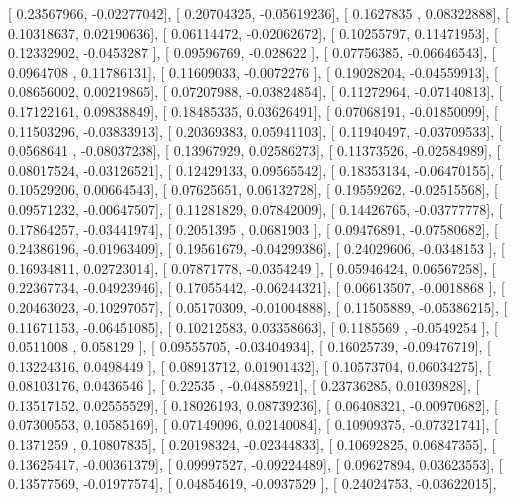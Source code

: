 \documentclass{article}
\begin{document}
       [ 0.23567966, -0.02277042],
       [ 0.20704325, -0.05619236],
       [ 0.1627835 ,  0.08322888],
       [ 0.10318637,  0.02190636],
       [ 0.06114472, -0.02062672],
       [ 0.10255797,  0.11471953],
       [ 0.12332902, -0.0453287 ],
       [ 0.09596769, -0.028622  ],
       [ 0.07756385, -0.06646543],
       [ 0.0964708 ,  0.11786131],
       [ 0.11609033, -0.0072276 ],
       [ 0.19028204, -0.04559913],
       [ 0.08656002,  0.00219865],
       [ 0.07207988, -0.03824854],
       [ 0.11272964, -0.07140813],
       [ 0.17122161,  0.09838849],
       [ 0.18485335,  0.03626491],
       [ 0.07068191, -0.01850099],
       [ 0.11503296, -0.03833913],
       [ 0.20369383,  0.05941103],
       [ 0.11940497, -0.03709533],
       [ 0.0568641 , -0.08037238],
       [ 0.13967929,  0.02586273],
       [ 0.11373526, -0.02584989],
       [ 0.08017524, -0.03126521],
       [ 0.12429133,  0.09565542],
       [ 0.18353134, -0.06470155],
       [ 0.10529206,  0.00664543],
       [ 0.07625651,  0.06132728],
       [ 0.19559262, -0.02515568],
       [ 0.09571232, -0.00647507],
       [ 0.11281829,  0.07842009],
       [ 0.14426765, -0.03777778],
       [ 0.17864257, -0.03441974],
       [ 0.2051395 ,  0.0681903 ],
       [ 0.09476891, -0.07580682],
       [ 0.24386196, -0.01963409],
       [ 0.19561679, -0.04299386],
       [ 0.24029606, -0.0348153 ],
       [ 0.16934811,  0.02723014],
       [ 0.07871778, -0.0354249 ],
       [ 0.05946424,  0.06567258],
       [ 0.22367734, -0.04923946],
       [ 0.17055442, -0.06244321],
       [ 0.06613507, -0.0018868 ],
       [ 0.20463023, -0.10297057],
       [ 0.05170309, -0.01004888],
       [ 0.11505889, -0.05386215],
       [ 0.11671153, -0.06451085],
       [ 0.10212583,  0.03358663],
       [ 0.1185569 , -0.0549254 ],
       [ 0.0511008 ,  0.058129  ],
       [ 0.09555705, -0.03404934],
       [ 0.16025739, -0.09476719],
       [ 0.13224316,  0.0498449 ],
       [ 0.08913712,  0.01901432],
       [ 0.10573704,  0.06034275],
       [ 0.08103176,  0.0436546 ],
       [ 0.22535   , -0.04885921],
       [ 0.23736285,  0.01039828],
       [ 0.13517152,  0.02555529],
       [ 0.18026193,  0.08739236],
       [ 0.06408321, -0.00970682],
       [ 0.07300553,  0.10585169],
       [ 0.07149096,  0.02140084],
       [ 0.10909375, -0.07321741],
       [ 0.1371259 ,  0.10807835],
       [ 0.20198324, -0.02344833],
       [ 0.10692825,  0.06847355],
       [ 0.13625417, -0.00361379],
       [ 0.09997527, -0.09224489],
       [ 0.09627894,  0.03623553],
       [ 0.13577569, -0.01977574],
       [ 0.04854619, -0.0937529 ],
       [ 0.24024753, -0.03622015],
\end{document}
